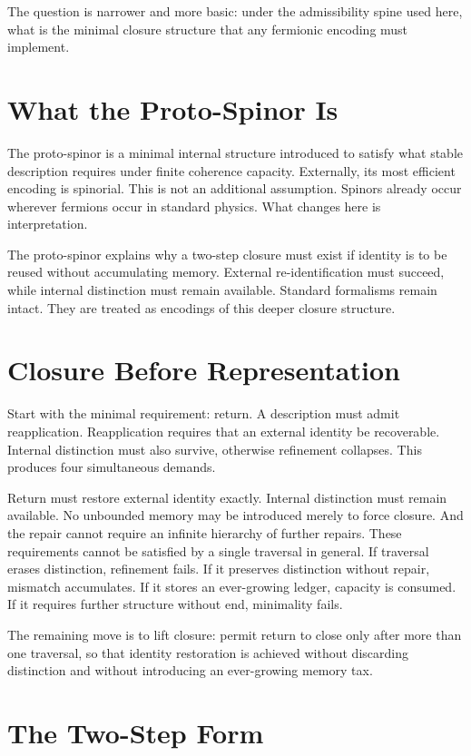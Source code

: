 \documentclass[11pt,twoside,openright]{book}
\begin{document}
The question is narrower and more basic: under the admissibility spine used here, what is the minimal closure structure that any fermionic encoding must implement.

\section*{What the Proto-Spinor Is}

The proto-spinor is a minimal internal structure introduced to satisfy what stable description requires under finite coherence capacity. Externally, its most efficient encoding is spinorial. This is not an additional assumption. Spinors already occur wherever fermions occur in standard physics. What changes here is interpretation.

The proto-spinor explains why a two-step closure must exist if identity is to be reused without accumulating memory. External re-identification must succeed, while internal distinction must remain available. Standard formalisms remain intact. They are treated as encodings of this deeper closure structure.

\section*{Closure Before Representation}

Start with the minimal requirement: return. A description must admit reapplication. Reapplication requires that an external identity be recoverable. Internal distinction must also survive, otherwise refinement collapses. This produces four simultaneous demands.

Return must restore external identity exactly. Internal distinction must remain available. No unbounded memory may be introduced merely to force closure. And the repair cannot require an infinite hierarchy of further repairs. These requirements cannot be satisfied by a single traversal in general. If traversal erases distinction, refinement fails. If it preserves distinction without repair, mismatch accumulates. If it stores an ever-growing ledger, capacity is consumed. If it requires further structure without end, minimality fails.

The remaining move is to lift closure: permit return to close only after more than one traversal, so that identity restoration is achieved without discarding distinction and without introducing an ever-growing memory tax.

\section*{The Two-Step Form}
\end{document}
